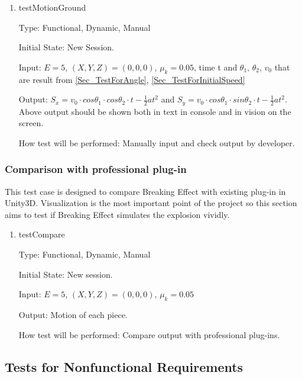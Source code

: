 \documentclass[12pt, titlepage]{article}
\begin{document}
\begin{enumerate}

\item{testMotionGround\\}

Type: Functional, Dynamic, Manual

Initial State: New Session.

Input: $E = 5$, $(X,Y,Z) = (0,0,0)$, $\mu_{k} = 0.05$, time t and $\theta_{1}$, $\theta_{2}$, $v_{0}$ that are result from \ref{Sec_TestForAngle}, \ref{Sec_TestForInitialSpeed}

Output: $S_{x}=v_{0}\cdot cos\theta _{1}\cdot cos\theta _{2}\cdot t-\frac{1}{2}at^{2}$ and $S_{y}=v_{0}\cdot cos\theta _{1}\cdot sin\theta _{2}\cdot t-\frac{1}{2}at^{2}$. Above output should be shown both in text in console and in vision on the screen.

How test will be performed: Manually input and check output by developer.

\end{enumerate}

\subsubsection{Comparison with professional plug-in}

This test case is designed to compare Breaking Effect with existing plug-in in Unity3D. Visualization is the most important point of the project so this section aims to test if Breaking Effect simulates the explosion vividly. 

\begin{enumerate}

\item{testCompare\\}

Type: Functional, Dynamic, Manual

Initial State: New session.

Input: $E = 5$, $(X,Y,Z) = (0,0,0)$, $\mu_{k} = 0.05$ 

Output: Motion of each piece.

How test will be performed: Compare output with professional plug-ins. 

\end{enumerate}

\subsection{Tests for Nonfunctional Requirements}
\end{document}
